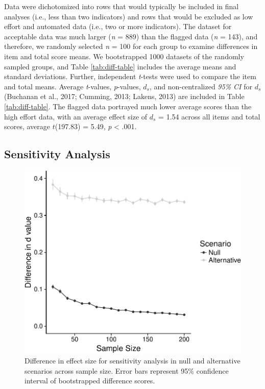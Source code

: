 \documentclass[english,man]{apa6}
\theoremstyle{definition}
\theoremstyle{definition}
\theoremstyle{definition}
\theoremstyle{remark}
\begin{document}
Data were dichotomized into rows that would typically be included in
final analyses (i.e., less than two indicators) and rows that would be
excluded as low effort and automated data (i.e., two or more
indicators). The dataset for acceptable data was much larger (\emph{n} =
889) than the flagged data (\emph{n} = 143), and therefore, we randomly
selected \emph{n} = 100 for each group to examine differences in item
and total score means. We bootstrapped 1000 datasets of the randomly
sampled groups, and Table \ref{tab:diff-table} includes the average
means and standard deviations. Further, independent \emph{t}-tests were
used to compare the item and total means. Average \emph{t}-values,
\emph{p}-values, \(d_s\), and non-centralized \emph{95\% CI} for \(d_s\)
(Buchanan et al., 2017; Cumming, 2013; Lakens, 2013) are included in
Table \ref{tab:diff-table}. The flagged data portrayed much lower
average scores than the high effort data, with an average effect size of
\(d_s\) = 1.54 across all items and total scores, average \(t\)(197.83)
= 5.49, \emph{p} \textless{} .001.

\subsection{Sensitivity Analysis}\label{sensitivity-analysis}

\begin{figure}
\centering
\includegraphics{SAD_manuscript_files/figure-latex/sense-graph-1.pdf}
\caption{\label{fig:sense-graph}Difference in effect size for sensitivity
analysis in null and alternative scenarios across sample size. Error
bars represent 95\% confidence interval of bootstrapped difference
scores.}
\end{figure}
\end{document}
